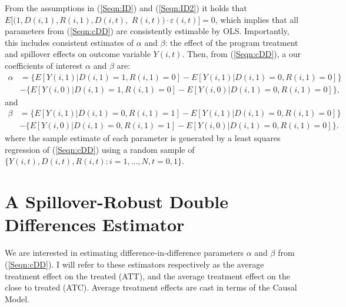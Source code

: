 From the assumptions in (\ref{Seqn:ID}) and (\ref{Seqn:ID2}) it holds that 
$E[(1,D(i,1),R(i,1),D(i,t),$
$R(i,t))\cdot\varepsilon(i,t)]=0$, which 
implies that all parameters from (\ref{Seqn:cDD}) are consistently estimable 
by OLS.  Importantly, this includes consistent estimates of $\alpha$ and 
$\beta$: the effect of the program treatment and spillover effects on 
outcome variable $Y(i,t)$.  Then, from (\ref{Seqn:cDD}), a our coefficients 
of interest $\alpha$ and $\beta$ are:
\begin{equation}
\nonumber
\label{Seqn:DDa}
\begin{split}
\alpha&=\{E[Y(i,1)|D(i,1)=1,R(i,1)=0]-E[Y(i,1)|D(i,1)=0,R(i,1)=0]\} \\
      &-\{E[Y(i,0)|D(i,1)=1,R(i,1)=0]-E[Y(i,0)|D(i,1)=0,R(i,1)=0]\}, 
\end{split}
\end{equation}
and 
\begin{equation}
\nonumber
\label{Seqn:DDb}
\begin{split}
\beta &=\{E[Y(i,1)|D(i,1)=0,R(i,1)=1]-E[Y(i,1)|D(i,1)=0,R(i,1)=0]\} \\
      &-\{E[Y(i,0)|D(i,1)=0,R(i,1)=1]-E[Y(i,0)|D(i,1)=0,R(i,1)=0]\}. 
\end{split}
\end{equation}
where the sample estimate of each parameter is generated by a least squares
regression of (\ref{Seqn:cDD}) using a random sample of 
$\{Y(i,t), D(i,t), R(i,t): i=1, \ldots, N, t=0, 1\}$.

\section{A Spillover-Robust Double Differences Estimator}
\label{Sscn:estim}
We are interested in estimating difference-in-difference parameters $\alpha$ and 
$\beta$ from (\ref{Seqn:cDD}).  I will refer to these estimators respectively
as the average treatment effect on the treated (ATT), and the average treatment
effect on the close to treated (ATC).  Average treatment effects are cast in 
terms of the \citet{Rubin1974} Causal Model.


